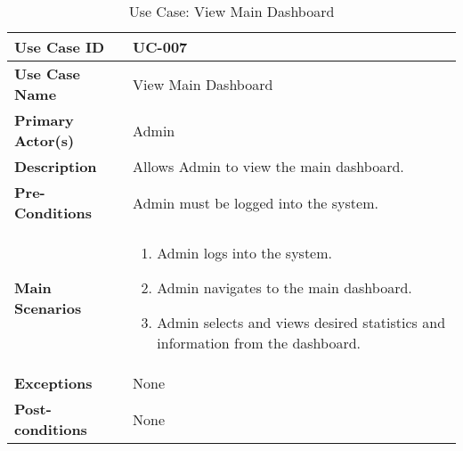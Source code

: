\begin{table}[ht]
    \centering
    \begin{tabular}{|l|p{}|}
        \hline
        \textbf{Use Case ID} & UC-007 \\
        \hline
        \textbf{Use Case Name} & View Main Dashboard \\
        \hline
        \textbf{Primary Actor(s)} & Admin \\
        \hline
        \textbf{Description} & Allows Admin to view the main dashboard. \\
        \hline
        \textbf{Pre-Conditions} & Admin must be logged into the system. \\
        \hline
        \textbf{Main Scenarios} & 
        \begin{enumerate}[label=\arabic*.,itemsep=0pt]
            \item Admin logs into the system.
            \item Admin navigates to the main dashboard.
            \item Admin selects and views desired statistics and information from the dashboard.
        \end{enumerate} \\
        \hline
        \textbf{Exceptions} & None \\
        \hline
        \textbf{Post-conditions} & None \\
        \hline
    \end{tabular}
    \label{tab:use-case-view-main-dashboard}
    \caption{Use Case: View Main Dashboard}
\end{table}




